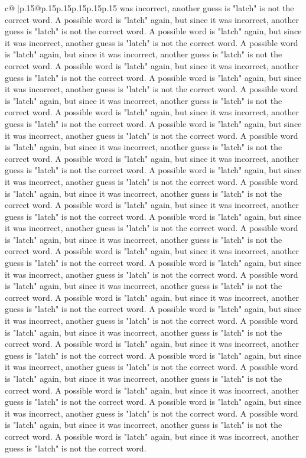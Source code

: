\documentclass{article}
\begin{document}
{\begin{supertabular}{c@{$\;$}|p{.15\linewidth}@{}p{.15\linewidth}p{.15\linewidth}p{.15\linewidth}p{.15\linewidth}p{.15\linewidth}}
{{{was incorrect, another guess is "latch" is not the correct word. A possible word is "latch" again, but since it was incorrect, another guess is "latch" is not the correct word. A possible word is "latch" again, but since it was incorrect, another guess is "latch" is not the correct word. A possible word is "latch" again, but since it was incorrect, another guess is "latch" is not the correct word. A possible word is "latch" again, but since it was incorrect, another guess is "latch" is not the correct word. A possible word is "latch" again, but since it was incorrect, another guess is "latch" is not the correct word. A possible word is "latch" again, but since it was incorrect, another guess is "latch" is not the correct word. A possible word is "latch" again, but since it was incorrect, another guess is "latch" is not the correct word. A possible word is "latch" again, but since it was incorrect, another guess is "latch" is not the correct word. A possible word is "latch" again, but since it was incorrect, another guess is "latch" is not the correct word. A possible word is "latch" again, but since it was incorrect, another guess is "latch" is not the correct word. A possible word is "latch" again, but since it was incorrect, another guess is "latch" is not the correct word. A possible word is "latch" again, but since it was incorrect, another guess is "latch" is not the correct word. A possible word is "latch" again, but since it was incorrect, another guess is "latch" is not the correct word. A possible word is "latch" again, but since it was incorrect, another guess is "latch" is not the correct word. A possible word is "latch" again, but since it was incorrect, another guess is "latch" is not the correct word. A possible word is "latch" again, but since it was incorrect, another guess is "latch" is not the correct word. A possible word is "latch" again, but since it was incorrect, another guess is "latch" is not the correct word. A possible word is "latch" again, but since it was incorrect, another guess is "latch" is not the correct word. A possible word is "latch" again, but since it was incorrect, another guess is "latch" is not the correct word. A possible word is "latch" again, but since it was incorrect, another guess is "latch" is not the correct word. A possible word is "latch" again, but since it was incorrect, another guess is "latch" is not the correct word. A possible word is "latch" again, but since it was incorrect, another guess is "latch" is not the correct word. A possible word is "latch" again, but since it was incorrect, another guess is "latch" is not the correct word. A possible word is "latch" again, but since it was incorrect, another guess is "latch" is not the correct word. A possible word is "latch" again, but since it was incorrect, another guess is "latch" is not the correct word. A possible word is "latch" again, but since it was incorrect, another guess is "latch" is not the correct word. A possible word is "latch" again, but since it was incorrect, another guess is "latch" is not the correct word. A possible word is "latch" again, but since it was incorrect, another guess is "latch" is not the correct word. }}}
\end{supertabular}}
\end{document}
